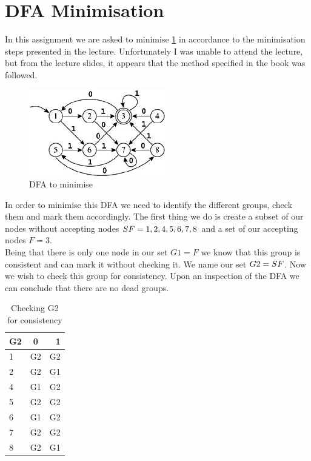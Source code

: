 \documentclass{article}
\begin{document}
\section{DFA Minimisation}
In this assignment we are asked to minimise \ref{dfatomin} in accordance to the minimisation steps presented in the lecture. Unfortunately I was unable to attend the lecture, but from the lecture slides, it appears that the method specified in the book was followed.\\

\begin{figure}[h]
\begin{center}
	\includegraphics{dfatominimise.png}
	\caption{DFA to minimise}
	\label{dfatomin}
\end{center}
\end{figure}

In order to minimise this DFA we need to identify the different groups, check them and mark them accordingly. The first thing we do is create a subset of our nodes without accepting nodes \(S\\F={1,2,4,5,6,7,8}\) and a set of our accepting nodes \(F={3}\).\\
Being that there is only one node in our set \(G1=F\) we know that this group is consistent and can mark it without checking it. We name our set \(G2=S\\F\). Now we wish to check this group for consistency. Upon an inspection of the DFA we can conclude that there are no dead groups.\\
\begin{table}[h]
	\begin{center}
		\begin{tabular}{|l|c|r|}
			\hline
			G2 & 0 & 1\\\hline
			1 & G2 & G2\\\hline
			2 & G2 & G1\\\hline
			4 & G1 & G2\\\hline
			5 & G2 & G2\\\hline
			6 & G1 & G2\\\hline
			7 & G2 & G2\\\hline
			8 & G2 & G1\\\hline
		\end{tabular}
	\caption{Checking G2 for consistency}
	\end{center}
\end{table}
\end{document}
